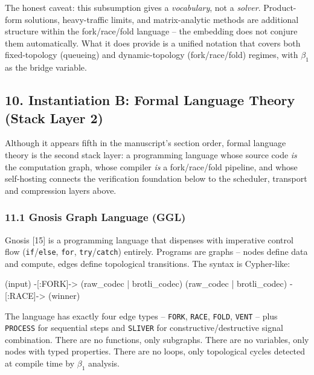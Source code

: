 \documentclass[
  11pt,
]{article}
\newenvironment{Shaded}{}{}
\newcommand{\NormalTok}[1]{#1}
\begin{document}
The honest caveat: this subsumption gives a \emph{vocabulary}, not a
\emph{solver}. Product-form solutions, heavy-traffic limits, and
matrix-analytic methods are additional structure within the
fork/race/fold language -- the embedding does not conjure them
automatically. What it does provide is a unified notation that covers
both fixed-topology (queueing) and dynamic-topology (fork/race/fold)
regimes, with \(\beta_1\) as the bridge variable.

\subsection{10. Instantiation B: Formal Language Theory (Stack Layer
2)}\label{instantiation-b-formal-language-theory-stack-layer-2}

Although it appears fifth in the manuscript's section order, formal
language theory is the second stack layer: a programming language whose
source code \emph{is} the computation graph, whose compiler \emph{is} a
fork/race/fold pipeline, and whose self-hosting connects the
verification foundation below to the scheduler, transport and
compression layers above.

\subsubsection{11.1 Gnosis Graph Language
(GGL)}\label{gnosis-graph-language-ggl}

Gnosis {[}15{]} is a programming language that dispenses with imperative
control flow (\texttt{if}/\texttt{else}, \texttt{for},
\texttt{try}/\texttt{catch}) entirely. Programs are graphs -- nodes
define data and compute, edges define topological transitions. The
syntax is Cypher-like:

\begin{Shaded}
\begin{Highlighting}[]
\NormalTok{(input) {-}[:FORK]{-}\textgreater{} (raw\_codec | brotli\_codec)}
\NormalTok{(raw\_codec | brotli\_codec) {-}[:RACE]{-}\textgreater{} (winner)}
\end{Highlighting}
\end{Shaded}

The language has exactly four edge types -- \texttt{FORK},
\texttt{RACE}, \texttt{FOLD}, \texttt{VENT} -- plus \texttt{PROCESS} for
sequential steps and \texttt{SLIVER} for constructive/destructive
signal combination. There are no functions, only subgraphs. There are no
variables, only nodes with typed properties. There are no loops, only
topological cycles detected at compile time by \(\beta_1\) analysis.
\end{document}
